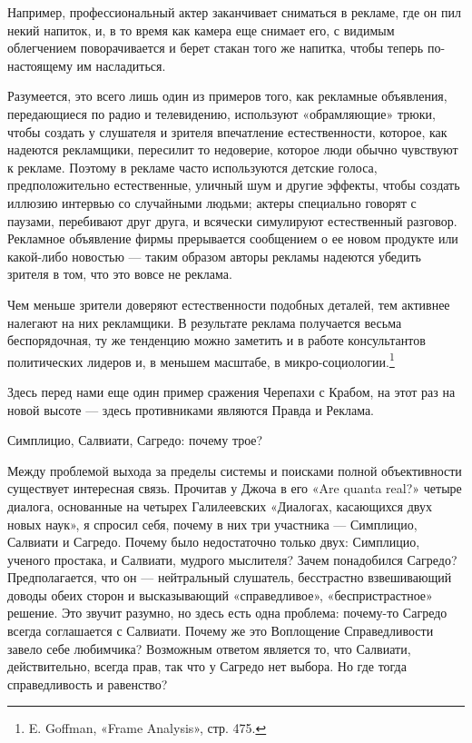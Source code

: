 Например, профессиональный актер заканчивает сниматься в рекламе, где он пил некий напиток, и, в то время как камера еще снимает его, с видимым облегчением поворачивается и берет стакан того же напитка, чтобы теперь по-настоящему им насладиться.

Разумеется, это всего лишь один из примеров того, как рекламные объявления, передающиеся по радио и телевидению, используют «обрамляющие» трюки, чтобы создать у слушателя и зрителя впечатление естественности, которое, как надеются рекламщики, пересилит то недоверие, которое люди обычно чувствуют к рекламе. Поэтому в рекламе часто используются детские голоса, предположительно естественные, уличный шум и другие эффекты, чтобы создать иллюзию интервью со случайными людьми; актеры специально говорят с паузами, перебивают друг друга, и всячески симулируют естественный разговор. Рекламное объявление фирмы прерывается сообщением о ее новом продукте или какой-либо новостью --- таким образом авторы рекламы надеются убедить зрителя в том, что это вовсе не реклама.

Чем меньше зрители доверяют естественности подобных деталей, тем активнее налегают на них рекламщики. В результате реклама получается весьма беспорядочная, ту же тенденцию можно заметить и в работе консультантов политических лидеров и, в меньшем масштабе, в микро-социологии.\footnote{E. Goffman, «Frame Analysis», стр. 475.}

Здесь перед нами еще один пример сражения Черепахи с Крабом, на этот раз на новой высоте --- здесь противниками являются Правда и Реклама.

Симплицио, Салвиати, Сагредо: почему трое?

Между проблемой выхода за пределы системы и поисками полной объективности существует интересная связь. Прочитав у Джоча в его «Are quanta real?» четыре диалога, основанные на четырех Галилеевских «Диалогах, касающихся двух новых наук», я спросил себя, почему в них три участника --- Симплицио, Салвиати и Сагредо. Почему было недостаточно только двух: Симплицио, ученого простака, и Салвиати, мудрого мыслителя? Зачем понадобился Сагредо? Предполагается, что он --- нейтральный слушатель, бесстрастно взвешивающий доводы обеих сторон и высказывающий «справедливое», «беспристрастное» решение. Это звучит разумно, но здесь есть одна проблема: почему-то Сагредо всегда соглашается с Салвиати. Почему же это Воплощение Справедливости завело себе любимчика? Возможным ответом является то, что Салвиати, действительно, всегда прав, так что у Сагредо нет выбора. Но где тогда справедливость и равенство?

